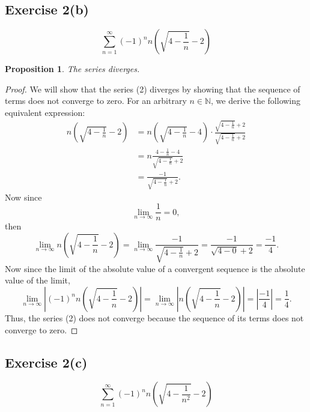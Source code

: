 \documentclass[12pt]{article}
\newtheorem{proposition}{Proposition}
\newenvironment{problem}
    {\begin{lrbox}{\mybox}\begin{minipage}{0.98\textwidth}}
    {\end{minipage}\end{lrbox}\framebox[\textwidth]{\usebox{\mybox}}}
\newcommand{\N}{\mathbb{N}} %
\newcommand{\<}{\left\langle} %
\renewcommand{\>}{\right\rangle} %
\begin{document}
\newpage
\subsection*{Exercise 2(b)}
\begin{problem}
    \begin{equation}
        \sum_{n=1}^\infty (-1)^n n \left( \sqrt{4 - \frac{1}{n}} - 2 \right)
    \end{equation}
\end{problem}

\begin{proposition}
    The series diverges.
\end{proposition}

\begin{proof}
    We will show that the series (2) diverges by showing that the sequence of terms does not converge to zero. For an arbitrary $n \in \N$, we derive the following equivalent expression:
    \begin{align*}
        n \left( \sqrt{4 - \frac{1}{n}} - 2 \right)
            &= n \left( \sqrt{4 - \frac{1}{n}} - 4 \right) \cdot \frac{\sqrt{4 - \frac{1}{n}} + 2}{\sqrt{4 - \frac{1}{n}} + 2} \\
            &= n \frac{4 - \frac{1}{n} - 4}{\sqrt{4 - \frac{1}{n}} + 2} \\
            &= \frac{-1}{\sqrt{4 - \frac{1}{n}} + 2}.
    \end{align*}
    Now since
    \[\lim_{n \to \infty} \frac{1}{n} = 0,\]
    then
    \[\lim_{n \to \infty} n \left( \sqrt{4 - \frac{1}{n}} - 2 \right) = \lim_{n \to \infty} \frac{-1}{\sqrt{4 - \frac{1}{n}} + 2} = \frac{-1}{\sqrt{4 - 0} + 2} = \frac{-1}{4}.\]
    Now since the limit of the absolute value of a convergent sequence is the absolute value of the limit,
    \[\lim_{n \to \infty} \left| (-1)^n n \left( \sqrt{4 - \frac{1}{n}} - 2 \right) \right| = \lim_{n \to \infty} \left| n \left( \sqrt{4 - \frac{1}{n}} - 2 \right) \right| = \left| \frac{-1}{4} \right| = \frac{1}{4}.\]
    Thus, the series (2) does not converge because the sequence of its terms does not converge to zero.
    
\end{proof}

\newpage
\subsection*{Exercise 2(c)}
\begin{problem}
    \begin{equation}
        \sum_{n=1}^\infty (-1)^n n\left (\sqrt{4 - \frac{1}{n^2}} -2 \right)
    \end{equation}
\end{problem}
\end{document}
